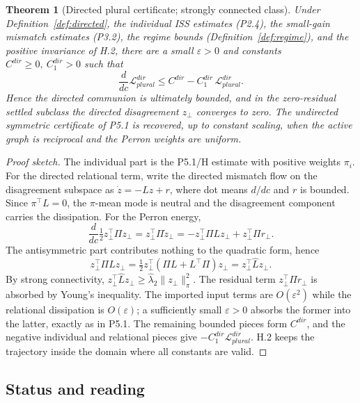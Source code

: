 \documentclass[11pt,a4paper]{article}
\def\mathfrak#1{#1}%
\def\mathrm#1{#1}%
\theoremstyle{definition}
\theoremstyle{plain}
\newtheorem{theorem}[definition]{Theorem}
\theoremstyle{remark}
\begin{document}
\begin{theorem}[Directed plural certificate; strongly connected class]\label{thm:directed}
Under Definition~\ref{def:directed}, the individual ISS estimates (P2.4), the small-gain
mismatch estimates (P3.2), the regime bounds (Definition~\ref{def:regime}), and the positive
invariance of H.2, there are a small \(\varepsilon>0\) and constants
\(C^{\mathrm{dir}}\ge0,\ C^{\mathrm{dir}}_1>0\) such that
\[
\frac{d}{d\mathfrak c}\mathcal L_{\mathrm{plural}}^{\mathrm{dir}}
\le
C^{\mathrm{dir}}-C^{\mathrm{dir}}_1\,\mathcal L_{\mathrm{plural}}^{\mathrm{dir}} .
\]
Hence the directed communion is ultimately bounded, and in the zero-residual settled subclass
the directed disagreement \(z_\perp\) converges to zero. The undirected symmetric certificate
of P5.1 is recovered, up to constant scaling, when the active graph is reciprocal and the
Perron weights are uniform.
\end{theorem}

\begin{proof}[Proof sketch]
The individual part is the P5.1/H estimate with positive weights \(\pi_i\). For the directed
relational term, write the directed mismatch flow on the disagreement subspace as
\(\dot z=-Lz+r\), where dot means \(d/d\mathfrak c\) and \(r\) is bounded. Since
\(\pi^\top L=0\), the \(\pi\)-mean mode is neutral and the disagreement component carries
the dissipation. For the Perron energy,
\[
\frac{d}{d\mathfrak c}\tfrac12 z_\perp^\top\Pi z_\perp
=
z_\perp^\top\Pi\dot z_\perp
=
-z_\perp^\top\Pi Lz_\perp+z_\perp^\top\Pi r_\perp .
\]
The antisymmetric part contributes nothing to the quadratic form, hence
\[
z_\perp^\top\Pi Lz_\perp
=
\tfrac12 z_\perp^\top(\Pi L+L^\top\Pi)z_\perp
=
z_\perp^\top\widehat Lz_\perp .
\]
By strong connectivity, \(z_\perp^\top\widehat Lz_\perp\ge\widehat\lambda_2\lVert z_\perp\rVert_\pi^2\).
The residual term \(z_\perp^\top\Pi r_\perp\) is absorbed by Young's inequality. The imported
input terms are \(O(\varepsilon^2)\) while the relational dissipation is \(O(\varepsilon)\);
a sufficiently small \(\varepsilon>0\) absorbs the former into the latter, exactly as in
P5.1. The remaining bounded pieces form \(C^{\mathrm{dir}}\), and the negative individual and
relational pieces give \(-C^{\mathrm{dir}}_1\mathcal L_{\mathrm{plural}}^{\mathrm{dir}}\).
H.2 keeps the trajectory inside the domain where all constants are valid. \qedhere
\end{proof}

\subsection{Status and reading}
\end{document}

